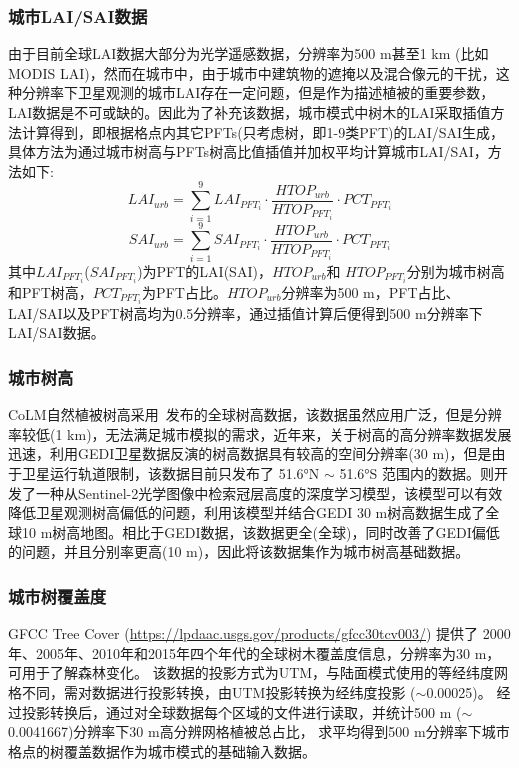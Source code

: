 \subsubsection{城市LAI/SAI数据}\label{城市LAISAI数据}
由于目前全球LAI数据大部分为光学遥感数据，分辨率为500 m甚至1 km (比如MODIS LAI)，然而在城市中，由于城市中建筑物的遮掩以及混合像元的干扰，这种分辨率下卫星观测的城市LAI存在一定问题，但是作为描述植被的重要参数，LAI数据是不可或缺的。因此为了补充该数据，城市模式中树木的LAI采取插值方法计算得到，即根据格点内其它PFTs(只考虑树，即1-9类PFT)的LAI/SAI生成，具体方法为通过城市树高与PFTs树高比值插值并加权平均计算城市LAI/SAI，方法如下:
\begin{equation}
  LAI_{urb}=\sum_{i=1}^{9} LAI_{PFT_{i}} \cdot \frac{HTOP_{urb}}{HTOP_{PFT_{i}}} \cdot PCT_{PFT_{i}}
\end{equation}
\begin{equation}
  SAI_{urb}=\sum_{i=1}^{9} SAI_{PFT_{i}} \cdot \frac{HTOP_{urb}}{HTOP_{PFT_{i}}} \cdot PCT_{PFT_{i}}
\end{equation}
其中$LAI_{PFT_{i}}$($SAI_{PFT_{i}}$)为PFT的LAI(SAI)，$HTOP_{urb}$和 $HTOP_{PFT_{i}}$分别为城市树高和PFT树高，$PCT_{PFT_{i}}$为PFT占比。$HTOP_{urb}$分辨率为500 m，PFT占比、LAI/SAI以及PFT树高均为0.5\textdegree{}分辨率，通过插值计算后便得到500 m分辨率下LAI/SAI数据。

\subsubsection{城市树高}\label{城市树高数据}
CoLM自然植被树高采用~\citet{simard2011mapping}发布的全球树高数据，该数据虽然应用广泛，但是分辨率较低(1 km)，无法满足城市模拟的需求，近年来，关于树高的高分辨率数据发展迅速，\citet{potapov2021mapping}利用GEDI卫星数据反演的树高数据具有较高的空间分辨率(30 m)，但是由于卫星运行轨道限制，该数据目前只发布了 \ang{51.6;;}N $\sim$ \ang{51.6;;}S 范围内的数据。\citet{lang2023high}则开发了一种从Sentinel-2光学图像中检索冠层高度的深度学习模型，该模型可以有效降低卫星观测树高偏低的问题，\citet{lang2023high}利用该模型并结合GEDI 30 m树高数据生成了全球10 m树高地图。相比于GEDI数据，该数据更全(全球)，同时改善了GEDI偏低的问题，并且分别率更高(10 m)，因此将该数据集作为城市树高基础数据。

\subsubsection{城市树覆盖度}
GFCC Tree Cover (\url{https://lpdaac.usgs.gov/products/gfcc30tcv003/}) 提供了
2000年、2005年、2010年和2015年四个年代的全球树木覆盖度信息，分辨率为30 m，可用于了解森林变化。
该数据的投影方式为UTM，与陆面模式使用的等经纬度网格不同，需对数据进行投影转换，由UTM投影转换为经纬度投影 ($\sim$0.00025\textdegree)。
经过投影转换后，通过对全球数据每个区域的文件进行读取，并统计500 m 
($\sim$0.0041667\textdegree)分辨率下30 m高分辨网格植被总占比，
求平均得到500 m分辨率下城市格点的树覆盖数据作为城市模式的基础输入数据。

